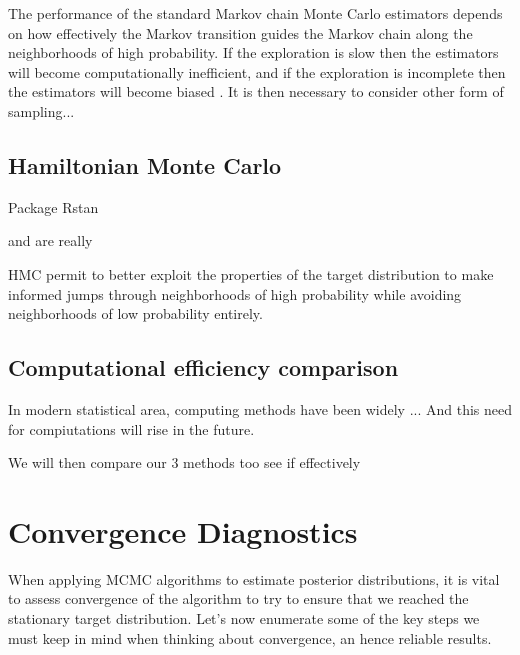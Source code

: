 The  performance  of  the standard  Markov  chain  Monte  Carlo  estimators  depends  on  how  effectively the Markov transition guides the Markov chain along the neighborhoods of high probability.  If  the  exploration  is  slow  then  the  estimators  will  become  computationally inefficient,  and  if  the  exploration  is  incomplete  then  the  estimators  will  become  biased
\citet{betancourt_diagnosing_2016}. It is then necessary to consider other form of sampling...


\subsection{Hamiltonian Monte Carlo}

Package Rstan

\cite{neal_mcmc_2011} and \cite{betancourt_hamiltonian_2015} are really 


HMC permit to better exploit the properties of
the target distribution to make informed jumps through neighborhoods of high probability while avoiding neighborhoods of low probability entirely.


\subsection{Computational efficiency comparison}

In modern statistical area, computing methods have been widely ... 
And this need for compiutations will rise in the future. 

We will then compare our 3 methods too see if effectively


\section{Convergence Diagnostics}

When applying MCMC algorithms to estimate posterior distributions, it is vital to assess convergence of the algorithm to try to ensure that we reached the stationary target distribution. Let's now enumerate some of the key steps we must keep in mind when thinking about convergence, an hence reliable results.

